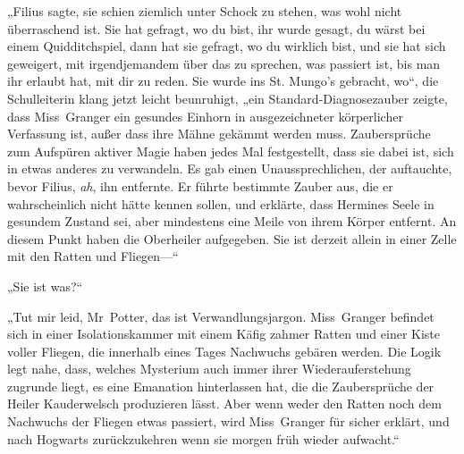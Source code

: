 „Filius sagte, sie schien ziemlich unter Schock zu stehen, was wohl nicht überraschend ist. Sie hat gefragt, wo du bist, ihr wurde gesagt, du wärst bei einem Quidditchspiel, dann hat sie gefragt, wo du wirklich bist, und sie hat sich geweigert, mit irgendjemandem über das zu sprechen, was passiert ist, bis man ihr erlaubt hat, mit dir zu reden. Sie wurde ins St. Mungo’s gebracht, wo“, die Schulleiterin klang jetzt leicht beunruhigt, „ein Standard-Diagnosezauber zeigte, dass Miss~Granger ein gesundes Einhorn in ausgezeichneter körperlicher Verfassung ist, außer dass ihre Mähne gekämmt werden muss. Zaubersprüche zum Aufspüren aktiver Magie haben jedes Mal festgestellt, dass sie dabei ist, sich in etwas anderes zu verwandeln.
Es gab einen Unaussprechlichen, der auftauchte, bevor Filius, \emph{ah}, ihn entfernte. Er führte bestimmte Zauber aus, die er wahrscheinlich nicht hätte kennen sollen, und erklärte, dass Hermines Seele in gesundem Zustand sei, aber mindestens eine Meile von ihrem Körper entfernt. An diesem Punkt haben die Oberheiler aufgegeben. Sie ist derzeit allein in einer Zelle mit den Ratten und Fliegen—“

„Sie ist was?“

„Tut mir leid, Mr~Potter, das ist Verwandlungsjargon. Miss~Granger befindet sich in einer Isolationskammer mit einem Käfig zahmer Ratten und einer Kiste voller Fliegen, die innerhalb eines Tages Nachwuchs gebären werden. Die Logik legt nahe, dass, welches Mysterium auch immer ihrer Wiederauferstehung zugrunde liegt, es eine Emanation hinterlassen hat, die die Zaubersprüche der Heiler Kauderwelsch produzieren lässt. Aber wenn weder den Ratten noch dem Nachwuchs der Fliegen etwas passiert, wird Miss~Granger für sicher erklärt, und nach Hogwarts zurückzukehren wenn sie morgen früh wieder aufwacht.“

